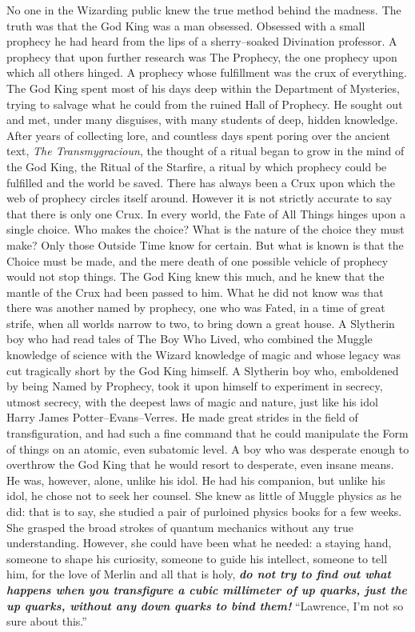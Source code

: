 \SmallVSpace
No one in the Wizarding public knew the true method behind the madness. The truth was that the God King was a man obsessed. Obsessed with a small prophecy he had heard from the lips of a sherry\mbox{--}soaked Divination professor. A prophecy that upon further research was The Prophecy, the one prophecy upon which all others hinged. A prophecy whose fulfillment was the crux of everything. The God King spent most of his days deep within the Department of Mysteries, trying to salvage what he could from the ruined Hall of Prophecy. He sought out and met, under many disguises, with many students of deep, hidden knowledge.
\SmallVSpace
After years of collecting lore, and countless days spent poring over the ancient text, \emph{The Transmygracioun}, the thought of a ritual began to grow in the mind of the God King, the Ritual of the Starfire, a ritual by which prophecy could be fulfilled and the world be saved.
\SmallVSpace
There has always been a Crux upon which the web of prophecy circles itself around. However it is not strictly accurate to say that there is only one Crux. In every world, the Fate of All Things hinges upon a single choice. Who makes the choice? What is the nature of the choice they must make? Only those Outside Time know for certain. But what is known is that the Choice must be made, and the mere death of one possible vehicle of prophecy would not stop things. The God King knew this much, and he knew that the mantle of the Crux had been passed to him.
\SmallVSpace
What he did not know was that there was another named by prophecy, one who was Fated, in a time of great strife, when all worlds narrow to two, to bring down a great house. A Slytherin boy who had read tales of The Boy Who Lived, who combined the Muggle knowledge of science with the Wizard knowledge of magic and whose legacy was cut tragically short by the God King himself. A Slytherin boy who, emboldened by being Named by Prophecy, took it upon himself to experiment in secrecy, utmost secrecy, with the deepest laws of magic and nature, just like his idol Harry James Potter\mbox{--}Evans\mbox{--}Verres. He made great strides in the field of transfiguration, and had such a fine command that he could manipulate the Form of things on an atomic, even subatomic level. A boy who was desperate enough to overthrow the God King that he would resort to desperate, even insane means.
\SmallVSpace
He was, however, alone, unlike his idol. He had his companion, but unlike his idol, he chose not to seek her counsel. She knew as little of Muggle physics as he did: that is to say, she studied a pair of purloined physics books for a few weeks. She grasped the broad strokes of quantum mechanics without any true understanding. However, she could have been what he needed: a staying hand, someone to shape his curiosity, someone to guide his intellect, someone to tell him, for the love of Merlin and all that is holy, \emph{\textbf{do not try to find out what happens when you transfigure a cubic millimeter of up quarks, just the up quarks, without any down quarks to bind them!}}
\simpleline
“Lawrence, I’m not so sure about this.”

